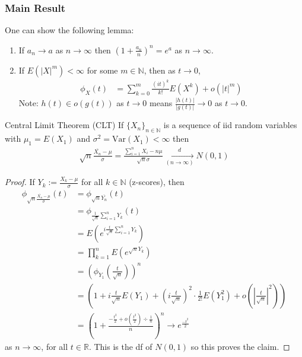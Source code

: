 \documentclass{article}
\newcommand{\R}{\mathbb{R}}
\newcommand{\N}{\mathbb{N}}
\newcommand{\Var}{\mathrm{Var}}
\begin{document}
			\subsubsection{Main Result}
			
			One can show the following lemma:
			
			\begin{mylem}{}{}
				\begin{enumerate}
					\item If $a_n\to a$ as $n\to\infty$ then $(1+\frac{a_n}{n})^n=e^a$ as $n\to\infty$.
					
					\item If $E(|X|^m)<\infty$ for some $m\in\N$, then as $t\to0$,
					\begin{align*}
						\phi_{X}(t)&=\sum_{k=0}^m\frac{(it)^k}{k!}E(X^k)+o(|t|^m)
					\end{align*}
					Note: $h(t)\in o(g(t))$ as $t\to0$ means $\frac{|h(t)|}{|g(t)|}\to0$ as $t\to0$.
				\end{enumerate}
			\end{mylem}
			
			\newpage
			\begin{mythm}{Central Limit Theorem (CLT)}{}
				If $\{X_n\}_{n\in\N}$ is a sequence of iid random variables with $\mu_1=E(X_1)$ and $\sigma^2=\Var(X_1)<\infty$ then
				\begin{align*}
					\sqrt{n}\frac{\overline{X_n}-\mu}{\sigma}=\frac{\sum_{i=1}^nX_i-n\mu}{\sqrt{n}\sigma}\underset{(n\to\infty)}{\overset{d}{\to}}N(0, 1)
				\end{align*}
				
				\begin{proof}
					If $Y_k:=\frac{X_k-\mu}{\sigma}$ for all $k\in\N$ (z-scores), then
					\begin{align*}
						\phi_{\sqrt{n}\frac{\overline{X_n}-\mu}{\sigma}}(t)&=\phi_{\sqrt{n}\overline{Y_n}}(t)\\
						&=\phi_{\frac{1}{\sqrt{n}}\sum_{i=1}^nY_k}(t)\\
						&=E(e^{i\frac{t}{\sqrt{n}}\sum_{i=1}^nY_k})\\
						&=\prod_{k=1}^nE(e^{\sqrt{n}Y_k})\\
						&=(\phi_{Y_1}(\frac{t}{\sqrt{n}}))^n\\
						&=(1+i\frac{t}{\sqrt{n}}E(Y_1)+(i\frac{t}{\sqrt{n}})^2\cdot\frac{1}{2!}E(Y_1^2)+o(|\frac{t}{\sqrt{n}}|^2))\\
						&=(1+\frac{-\frac{t^2}{2}+o(\frac{t^2}{2})\div\frac{1}{n}}{n})^n\to e^{\frac{-t^2}{2}}
					\end{align*}
					as $n\to\infty$, for all $t\in\R$. This is the df of $N(0, 1)$ so this proves the claim.
				\end{proof}
			\end{mythm}
			
\end{document}
